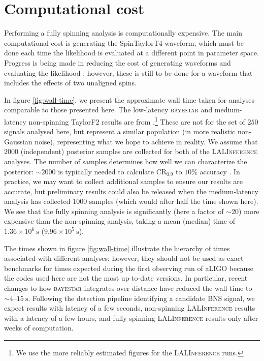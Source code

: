\appendix

\section{Computational cost}\label{ap:CPU}

Performing a fully spinning analysis is computationally expensive. The main computational cost is generating the SpinTaylorT4 waveform, which must be done each time the likelihood is evaluated at a different point in parameter space. Progress is being made in reducing the cost of generating waveforms and evaluating the likelihood \citep[e.g.,]{P_rrer_2014,Canizares_2015}; however, these is still to be done for a waveform that includes the effects of two unaligned spins.

In figure \ref{fig:wall-time}, we present the approximate wall time taken for analyses comparable to those presented here. The low-latency \textsc{bayestar} and medium-latency non-spinning TaylorF2 results are from \citet{Berry_2014}.\footnote{We use the more reliably estimated figures for the \textsc{LALInference} runs.} These are not for the set of $250$ signals analysed here, but represent a similar population (in more realistic non-Gaussian noise), representing what we hope to achieve in reality. We assume that $2000$ (independent) posterior samples are collected for both of the \textsc{LALInference} analyses. The number of samples determines how well we can characterize the posterior: $\sim2000$ is typically needed to calculate $\mathrm{CR}_{0.9}$ to $10\%$ accuracy \citep{DelPozzo_2015}. In practice, we may want to collect additional samples to ensure our results are accurate, but preliminary results could also be released when the medium-latency analysis has collected $1000$ samples (which would after half the time shown here). We see that the fully spinning analysis is significantly (here a factor of $\sim20$) more expensive than the non-spinning analysis, taking a mean (median) time of $1.36\times10^6~\mathrm{s}$ ($9.96\times10^5~\mathrm{s}$).

The times shown in figure \ref{fig:wall-time} illustrate the hierarchy of times associated with different analyses; however, they should not be used as exact benchmarks for times expected during the first observing run of aLIGO because the codes used here are not the most up-to-date versions. In particular, recent changes to how \textsc{bayestar} integrates over distance have reduced the wall time to $\sim 4$--$15~\mathrm{s}$. Following the detection pipeline identifying a candidate BNS signal, we expect  results with latency of a few seconds, non-spinning \textsc{LALInference} results with a latency of a few hours, and fully spinning \textsc{LALInference} results only after weeks of computation.


  